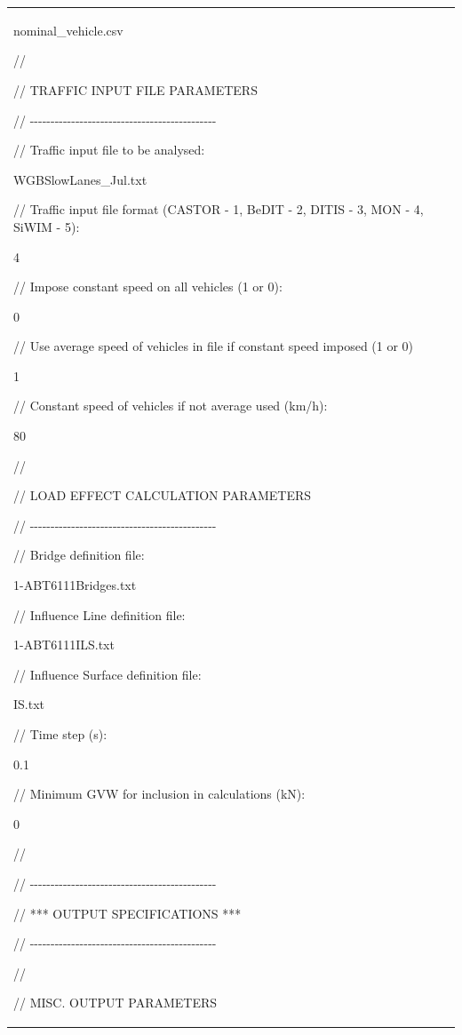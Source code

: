 \documentclass[
]{article}
\begin{document}
\begin{longtable}[]{@{}
  >{\centering\arraybackslash}p{}
  >{\raggedright\arraybackslash}p{}@{}}
nominal\_vehicle.csv

//

// TRAFFIC INPUT FILE PARAMETERS

//
-\/-\/-\/-\/-\/-\/-\/-\/-\/-\/-\/-\/-\/-\/-\/-\/-\/-\/-\/-\/-\/-\/-\/-\/-\/-\/-\/-\/-\/-\/-\/-\/-\/-\/-\/-\/-\/-\/-\/-\/-\/-\/-\/-\/-

// Traffic input file to be analysed:

WGBSlowLanes\_Jul.txt

// Traffic input file format (CASTOR - 1, BeDIT - 2, DITIS - 3, MON -
4, SiWIM - 5):

4

// Impose constant speed on all vehicles (1 or 0):

0

// Use average speed of vehicles in file if constant speed imposed (1 or
0)

1

// Constant speed of vehicles if not average used (km/h):

80

//

// LOAD EFFECT CALCULATION PARAMETERS

//
-\/-\/-\/-\/-\/-\/-\/-\/-\/-\/-\/-\/-\/-\/-\/-\/-\/-\/-\/-\/-\/-\/-\/-\/-\/-\/-\/-\/-\/-\/-\/-\/-\/-\/-\/-\/-\/-\/-\/-\/-\/-\/-\/-\/-

// Bridge definition file:

1-ABT6111Bridges.txt

// Influence Line definition file:

1-ABT6111ILS.txt

// Influence Surface definition file:

IS.txt

// Time step (s):

0.1

// Minimum GVW for inclusion in calculations (kN):

0

//

//
-\/-\/-\/-\/-\/-\/-\/-\/-\/-\/-\/-\/-\/-\/-\/-\/-\/-\/-\/-\/-\/-\/-\/-\/-\/-\/-\/-\/-\/-\/-\/-\/-\/-\/-\/-\/-\/-\/-\/-\/-\/-\/-\/-\/-

// *** OUTPUT SPECIFICATIONS ***

//
-\/-\/-\/-\/-\/-\/-\/-\/-\/-\/-\/-\/-\/-\/-\/-\/-\/-\/-\/-\/-\/-\/-\/-\/-\/-\/-\/-\/-\/-\/-\/-\/-\/-\/-\/-\/-\/-\/-\/-\/-\/-\/-\/-\/-

//

// MISC. OUTPUT PARAMETERS


\end{longtable}
\end{document}
